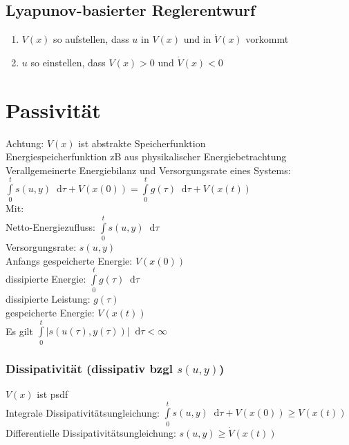 \documentclass[6pt,a4paper,fleqn]{scrartcl}
\newcommand*\diff{\mathop{}\!\mathrm{d}}
\begin{document}
\begin{multicols*}{4}
\subsection{Lyapunov-basierter Reglerentwurf}
\begin{enumerate}
  \item $V(x)$ so aufstellen, dass $u$ in $V(x)$ und in $\dot{V}(x)$ vorkommt
  \item $u$ so einstellen, dass $V(x) > 0$ und $\dot{V}(x) < 0$
\end{enumerate}


\section{Passivität}
Achtung: $V(x)$ ist abstrakte Speicherfunktion \\
Energiespeicherfunktion zB aus physikalischer Energiebetrachtung\\

Verallgemeinerte Energiebilanz und Versorgungsrate eines Systems:\\
$\int\limits_{0}^{t} s(u,y) \diff \tau + V(x(0)) = \int\limits_{0}^{t} g(\tau) \diff \tau + V(x(t))$  \\
Mit: \\
Netto-Energiezufluss: $\int\limits_{0}^{t} s(u,y) \diff \tau$ \\
Versorgungsrate: $s(u,y)$ \\
Anfangs gespeicherte Energie: $V(x(0))$ \\
dissipierte Energie: $\int\limits_{0}^{t} g(\tau) \diff \tau$ \\
dissipierte Leistung: $g(\tau)$ \\
gespeicherte Energie: $V(x(t))$ \\
Es gilt $\int\limits_{0}^{t}|s(u(\tau), y(\tau))| \diff \tau < \infty$

\subsubsection*{Dissipativität (dissipativ bzgl $s(u,y)$)}
$V(x)$ ist psdf \\
Integrale Dissipativitätsungleichung: $\int\limits_{0}^{t} s(u,y) \diff \tau + V(x(0)) \geq V(x(t))$ \\
Differentielle Dissipativitätsungleichung: $s(u,y) \geq \dot{V}(x(t))$


\end{multicols*}
\end{document}
